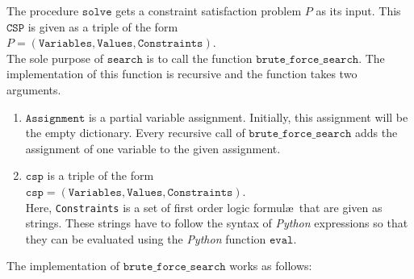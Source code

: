 The procedure $\texttt{solve}$ gets a constraint satisfaction problem $P$ as its input.  
This $\texttt{CSP}$ is given as a triple of the form  
\\[0.2cm]
\hspace*{1.3cm}
$P = (\texttt{Variables}, \texttt{Values}, \texttt{Constraints})$.
\\[0.2cm]
The sole purpose of $\texttt{search}$ is to call the function $\texttt{brute\_force\_search}$.  The
implementation of this function is recursive and the function takes two arguments.
\begin{enumerate}
\item $\texttt{Assignment}$ is a partial variable assignment.  Initially, this assignment will be the
      empty dictionary.  Every recursive call of $\texttt{brute\_force\_search}$ adds the assignment of one variable to
      the given assignment. 
\item $\texttt{csp}$ is a triple of the form
      \\[0.2cm]
      \hspace*{1.3cm}
      $\texttt{csp} = (\texttt{Variables}, \texttt{Values}, \texttt{Constraints})$.
      \\[0.2cm]
      Here, \texttt{Constraints} is a set of first order logic formul\ae\ that are given as strings.  These
      strings have to follow the syntax of \textsl{Python} expressions so that they can be evaluated using the
      \textsl{Python} function $\texttt{eval}$.
\end{enumerate}
The implementation of $\texttt{brute\_force\_search}$ works as follows:
